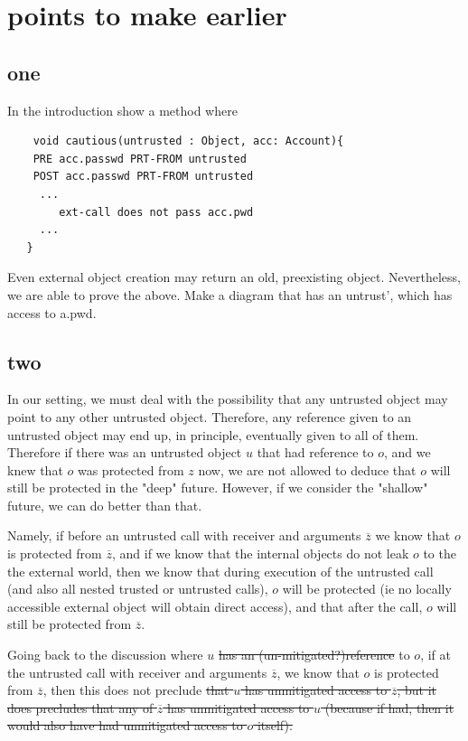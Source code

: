  \newcommand{\sdOct}[1]{#1}
\newcommand{\re}{\mathit{e}}

\section{points to make earlier}

\subsection{one}
In the introduction show a method where
\begin{lstlisting}
    void cautious(untrusted : Object, acc: Account){
    PRE acc.passwd PRT-FROM untrusted
    POST acc.passwd PRT-FROM untrusted
     ...
        ext-call does not pass acc.pwd
     ...
   }
\end{lstlisting}

Even external object creation may return an old, preexisting object.
Nevertheless, we are able to prove the above. Make a diagram that has an untrust', which has access to a.pwd. 


\subsection{two}
In our setting, we must deal with the possibility  that any untrusted object may point to any other untrusted object.
Therefore, any reference given to an untrusted object may end up, in principle,  eventually given to all of them.
Therefore if there was an untrusted object $u$ that had reference to $o$,  and we knew that $o$ was protected from $z$ now, we are not
allowed   to deduce that $o$ will still be protected in the "deep" future.
However, if we consider the "shallow" future, we can do better than that.

Namely, if  before an untrusted call with receiver and arguments $\overline z$ we know that $o$ is protected from $\overline z$, and if we know that the internal objects do not leak $o$ to the the external world, then we know that during execution of the untrusted call (and also all nested trusted or untrusted calls), $o$ will be protected (ie no locally accessible external object will obtain direct access), and that after the call, $o$ will still be protected from $\overline z$.

Going back to the discussion where $u$ 
\st{has an (un-mitigated?)reference} to $o$,  if at the untrusted call
with receiver and arguments $\overline z$, we know that $o$ is
protected from $\overline z$, then this does not preclude
\st{that $u$ has unmitigated access to $\overline z$, but it does precludes that any of  $\overline z$ has unmitigated access to $u$ (because if had, then it would also have had unmitigated access to $o$ itself).}


